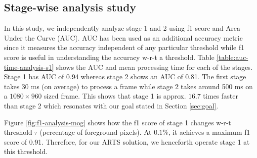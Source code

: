\vspace{5pt}
\subsection{Stage-wise analysis study}
In this study, we independently analyze stage 1 and 2 using f1 score and Area Under the Curve (AUC). AUC has been used as an additional accuracy metric since it measures the accuracy independent of any particular threshold while f1 score is useful in understanding the accuracy w-r-t a threshold.  
Table \ref{table:auc-time-analysis-s1} shows the AUC and mean processing time for each of the stages. Stage 1 has AUC of 0.94 whereas stage 2 shows an AUC of 0.81. The first stage takes 30 ms  (on average) to process a frame while stage 2 takes around 500 ms on a $1080 \times 960$ sized frame. This shows that stage 1 is approx. $16.7$ times faster than stage 2 which resonates with our goal stated in Section \ref{sec:goal}. 

Figure \ref{fig:f1-analysis-mog} shows how the f1 score of stage 1 changes w-r-t threshold $\tau$ (percentage of foreground pixels). At $0.1\%$, it achieves a maximum f1 score of 0.91. Therefore, for our ARTS solution, we henceforth operate stage 1 at this threshold.

